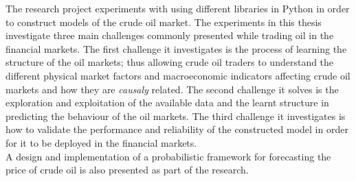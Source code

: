 \documentclass[a4paper]{article}
\begin{document}
The research project experiments with using different libraries in Python in order to construct models of the crude oil market. The experiments in this thesis investigate three main challenges commonly presented while trading oil in the financial markets. The first challenge it investigates is the process of learning the structure of the oil markets; thus allowing crude oil traders to understand the different physical market factors and macroeconomic indicators affecting crude oil markets and how they are \textit{causaly} related. The second challenge it solves is the exploration and exploitation of the available data and the learnt structure in predicting the behaviour of the oil markets. The third challenge it investigates is how to validate the performance and reliability of the constructed model in order for it to be deployed in the financial markets. \\

A design and implementation of a probabilistic framework for forecasting the price of crude oil is also presented as part of the research.\\
\end{document}
